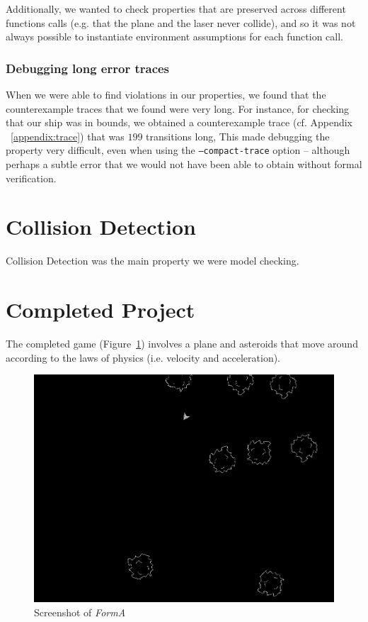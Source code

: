 \documentclass{article}
\newcommand{\Name}{\textit{FormA}\xspace}
\begin{document}
Additionally, we wanted to check properties that are preserved across different functions calls (e.g. that the plane and the laser never collide), and so it was not always possible to instantiate environment assumptions for each function call.


\subsubsection{Debugging long error traces}
When we were able to find violations in our properties, we found that the counterexample traces that we found were very long.
For instance, for checking that our ship was in bounds, we obtained a counterexample trace (cf. Appendix ~\ref{appendix:trace}) that was $199$ transitions long,
This made debugging the property very difficult, even when using the \texttt{--compact-trace} option -- 
although perhaps a subtle error that we would not have been able to obtain without formal verification.

\section{Collision Detection}
Collision Detection was the main property we were model checking.

\section{Completed Project}
The completed game (Figure~\ref{fig:gameplay}) involves a plane and asteroids that move around according to the laws of physics (i.e. velocity and acceleration).

\begin{figure}[h!]
    \includegraphics[width=\linewidth]{gameplay.png}
    \caption{Screenshot of \Name}
    \label{fig:gameplay}
\end{figure}
\end{document}
